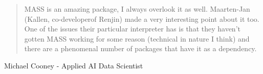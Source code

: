 \documentclass{beamer}
\begin{document}
\begin{frame}
\begin{quote}
MASS is an amazing package, I always overlook it as well. Maarten-Jan (Kallen, co-developerof Renjin)
made a very interesting point about it too. One of the issues their
particular interpreter has is that they haven't gotten MASS working
for some reason (technical in nature I think) and there are a
phenomenal number of packages that have it as a dependency.

\end{quote}
Michael Cooney - Applied AI Data Scientist
\end{frame}
\end{document}

